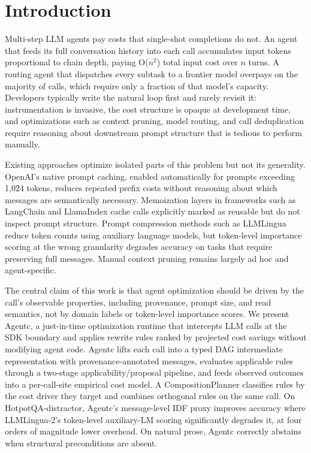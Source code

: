 \documentclass[sigconf,9pt]{acmart}
\begin{document}
\section{Introduction}

Multi-step LLM agents pay costs that single-shot completions do not. An agent that
feeds its full conversation history into each call accumulates input tokens
proportional to chain depth, paying O($n^2$) total input cost over $n$ turns. A
routing agent that dispatches every subtask to a frontier model overpays on the
majority of calls, which require only a fraction of that model's capacity. Developers
typically write the natural loop first and rarely revisit it: instrumentation is
invasive, the cost structure is opaque at development time, and optimizations such as
context pruning, model routing, and call deduplication require reasoning about
downstream prompt structure that is tedious to perform manually.

Existing approaches optimize isolated parts of this problem but not its generality.
OpenAI's native prompt caching, enabled automatically for prompts exceeding 1,024
tokens, reduces repeated prefix costs without reasoning about which messages are
semantically necessary. Memoization layers in frameworks such as LangChain and
LlamaIndex cache calls explicitly marked as reusable but do not inspect prompt
structure. Prompt compression methods such as LLMLingua~\cite{jiang2023llmlingua}
reduce token counts using auxiliary language models, but token-level importance
scoring at the wrong granularity degrades accuracy on tasks that require preserving
full messages. Manual context pruning remains largely ad hoc and agent-specific.

The central claim of this work is that agent optimization should be driven by
the call's observable properties, including provenance, prompt size, and read
semantics, not by domain labels or token-level importance scores. We present Agentc, a
just-in-time optimization runtime that intercepts LLM calls at the SDK boundary and
applies rewrite rules ranked by projected cost savings without modifying agent code.
Agentc lifts each call into a typed DAG intermediate representation with
provenance-annotated messages, evaluates applicable rules through a two-stage
applicability/proposal pipeline, and feeds observed outcomes into a per-call-site
empirical cost model. A CompositionPlanner classifies rules by the cost driver they
target and combines orthogonal rules on the same call. On HotpotQA-distractor, Agentc's
message-level IDF proxy improves accuracy where LLMLingua-2's token-level auxiliary-LM
scoring significantly degrades it, at four orders of magnitude lower overhead. On
natural prose, Agentc correctly abstains when structural preconditions are absent.
\end{document}
